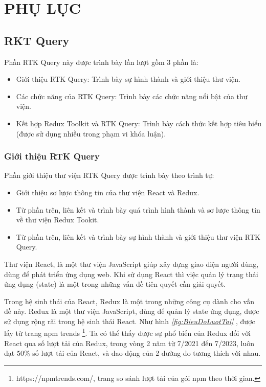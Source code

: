 \chapter{PHỤ LỤC}

\section{RKT Query} \label{sec:RTKQ}

\tab Phần RTK Query này được trình bày lần lượt gồm 3 phần là: 

\begin{itemize}
      \item Giới thiệu RTK Query: Trình bày sự hình thành và giới thiệu thư viện.
      \item Các chức năng của RTK Query: Trình bày các chức năng nổi bật của thư viện.
      \item Kết hợp Redux Toolkit và RTK Query: Trình bày cách thức kết hợp tiêu biểu (được sử dụng nhiều trong phạm vi khóa luận).
\end{itemize}

\subsection{Giới thiệu RTK Query}

\tab Phần giới thiệu thư viện RTK Query được trình bày theo trình tự:

\begin{itemize}
      \item Giới thiệu sơ lược thông tin của thư viện React và Redux.
      \item Từ phần trên, liên kết và trình bày quá trình hình thành và sơ lược thông tin về thư viện Redux Tookit.
      \item Từ phần trên, liên kết và trình bày sự hình thành và giới thiệu thư viện RTK Query.
\end{itemize}

\tab \tab Thư viện React, là một thư viện JavaScript giúp xây dựng giao diện người dùng, dùng để phát triển ứng dụng web.
Khi sử dụng React thì việc quản lý trạng thái ứng dụng (state) là một trong những vấn đề tiên quyết cần giải quyết.

Trong hệ sinh thái của React, Redux là một trong những công cụ dành cho vấn đề này.
Redux là một thư viện JavaScript, dùng để quản lý state ứng dụng, được sử dụng rộng rãi trong hệ sinh thái React.
Như hình \textit{\ref{fig:BieuDoLuotTai} }, được lấy từ trang npm trends \footnote{https://npmtrends.com/, trang so sánh lượt tải của gói npm theo thời gian.}.
Ta có thể thấy được sự phổ biến của Redux đối với React qua số lượt tải của Redux, trong vòng 2 năm từ 7/2021 đến 7/2023, luôn đạt 50\% số lượt tải của React, và dao động của 2 đường đo tương thích với nhau.

